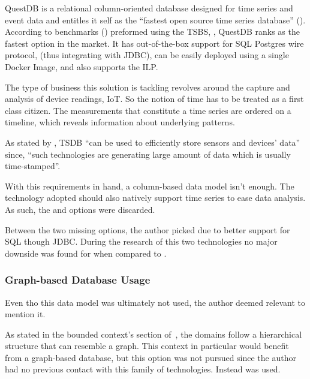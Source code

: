 QuestDB is a relational column-oriented database designed for time series and event data and entitles it self as the ``fastest open source time series database'' (\cite{questdb}).
According to benchmarks (\cite{quest-bench}) preformed using the \gls{TSBS}, \cite{TSBS}, QuestDB ranks as the fastest option in the market.
It has out-of-the-box support for SQL Postgres wire protocol, (thus integrating with \gls{JDBC}), can be easily deployed using a single Docker Image, and also supports the \gls{ILP}.

The type of business this solution is tackling revolves around the capture and analysis of device readings, \gls{IoT}. So the notion of time has to be treated as a first class citizen. The measurements that constitute a time series are ordered on a timeline, which reveals information about underlying patterns.

As stated by \cite{naqvi2017time}, \gls{TSDB} ``can be used to efficiently store sensors and devices' data'' since, ``such technologies are generating large amount of data which is usually time-stamped''.

With this requirements in hand, a column-based data model isn't enough. The technology adopted should also natively support time series to ease data analysis. As such, the  and  options were discarded.

Between the two missing options, the author picked  due to better support for \gls{SQL} though \gls{JDBC}. During the research of this two technologies no major downside was found for  when compared to .

\subsubsection*{Graph-based Database Usage}
\label{subsubsec:implementation:decisions:database:identity}

Even tho this data model was ultimately not used, the author deemed relevant to mention it.

As stated in the bounded context's section of~, the domains follow a hierarchical structure that can resemble a graph. This context in particular would benefit from a  graph-based database, but this option was not pursued since the author had no previous contact with this family of technologies. Instead  was used.

